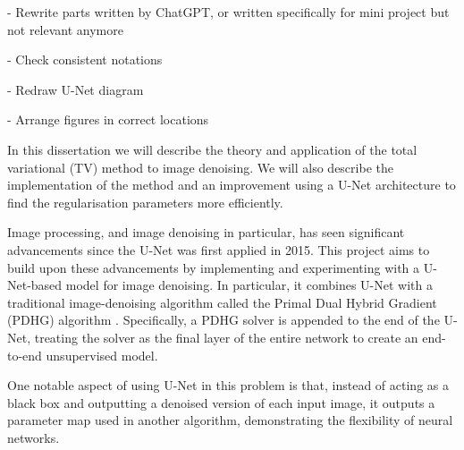 \documentclass[12pt]{article}
\begin{document}
- Rewrite parts written by ChatGPT, or written specifically for mini project but not relevant anymore

- Check consistent notations

- Redraw U-Net diagram

- Arrange figures in correct locations




In this dissertation we will describe the theory and application of the total variational (TV) method to image denoising. 
We will also describe the implementation of the method and an improvement using a U-Net architecture to find the regularisation parameters more efficiently. 


Image processing, and image denoising in particular, has seen significant advancements since the U-Net was first applied in 2015. This project aims to build upon these advancements by implementing and experimenting with a U-Net-based model for image denoising.
In particular, it combines U-Net with a traditional image-denoising algorithm called the Primal Dual Hybrid Gradient (PDHG) algorithm \cite{kofler2023learning}.
Specifically, a PDHG solver is appended to the end of the U-Net, treating the solver as the final layer of the entire network to create an end-to-end unsupervised model.


One notable aspect of using U-Net in this problem is that, instead of acting as a black box and outputting a denoised version of each input image, it outputs a parameter map used in another algorithm, demonstrating the flexibility of neural networks.
\end{document}
